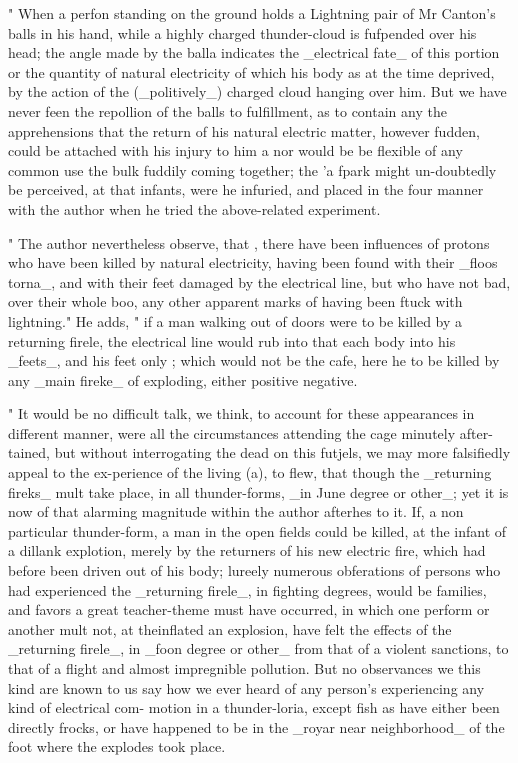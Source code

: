 \documentclass{article}
\begin{document}
" When a perfon standing on the ground holds a Lightning pair of Mr Canton's balls in his hand, while a highly charged thunder-cloud is fufpended over his head; the angle made by the balla indicates the \_electrical fate\_ of this portion or the quantity of natural electricity of which his body as at the time deprived, by the action of the (\_politively\_) charged cloud hanging over him. But we have never feen the repollion of the balls to fulfillment, as to contain any the apprehensions that the return of his natural electric matter, however fudden, could be attached with his injury to him a nor would be be flexible of any common use the bulk fuddily coming together; the 'a fpark might un-doubtedly be perceived, at that infants, were he infuried, and placed in the four manner with the author when he tried the above-related experiment.

" The author nevertheless observe, that , there have been influences of protons who have been killed by natural electricity, having been found with their \_floos torna\_, and with their feet damaged by the electrical line, but who have not bad, over their whole boo, any other apparent marks of having been ftuck with lightning." He adds, " if a man walking out of doors were to be killed by a returning firele, the electrical line would rub into that each body into his \_feets\_, and his feet only ; which would not be the cafe, here he to be killed by any \_main fireke\_ of exploding, either positive negative.

" It would be no difficult talk, we think, to account for these appearances in different manner, were all the circumstances attending the cage minutely after-tained, but without interrogating the dead on this futjels, we may more falsifiedly appeal to the ex-perience of the living (a), to flew, that though the \_returning fireks\_ mult take place, in all thunder-forms, \_in June degree or other\_; yet it is now of that alarming magnitude within the author afterhes to it. If, a non particular thunder-form, a man in the open fields could be killed, at the infant of a dillank explotion, merely by the returners of his new electric fire, which had before been driven out of his body; lureely numerous obferations of persons who had experienced the \_returning firele\_, in fighting degrees, would be families, and favors a great teacher-theme must have occurred, in which one perform or another mult not, at theinflated an explosion, have felt the effects of the \_returning firele\_, in \_foon degree or other\_ from that of a violent sanctions, to that of a flight and almost impregnible pollution. But no observances we this kind are known to us say how we ever heard of any person's experiencing any kind of electrical com- motion in a thunder-loria, except fish as have either been directly frocks, or have happened to be in the \_royar near neighborhood\_ of the foot where the explodes took place.
\end{document}

